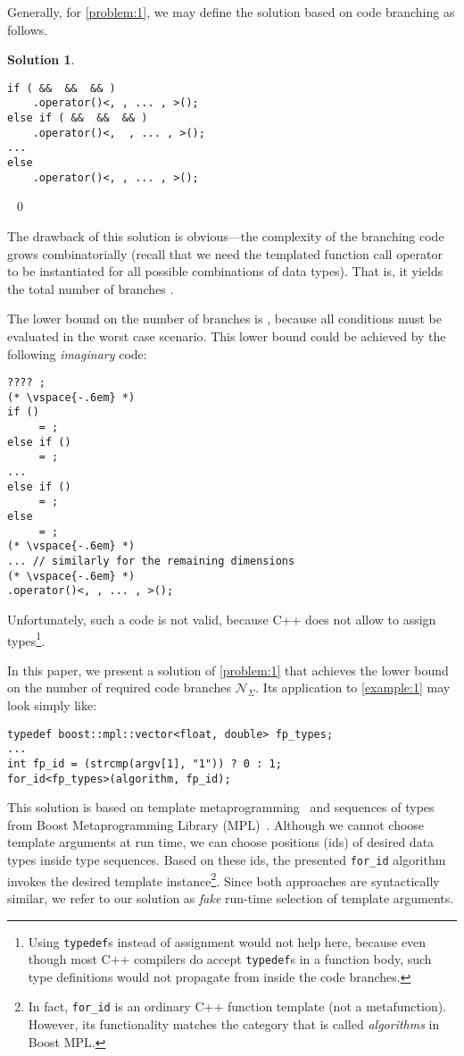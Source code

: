 \documentclass[10pt,a4paper]{article}
\theoremstyle{definition}\newtheorem{problem}{Problem}
\newtheorem{solution}{Solution}
\providecommand{\symcbsum}{\ensuremath{\mathcal{N}_{\Sigma}}\xspace}
\providecommand{\forid}{\texttt{for\_id}\xspace}
\begin{document}
Generally, for \autoref{problem:1}, we may define the solution based on code branching as follows.
\begin{solution}\ 
\begin{lstlisting}
if ( &&  &&  && )
    .operator()<, , ... , >();
else if ( &&  &&  && )
    .operator()<,  , ... , >();
...
else
    .operator()<, , ... , >();
\end{lstlisting}

\vspace{-.4em} \ \qed
\end{solution}

\vspace{-.6em}
The drawback of this solution is obvious---the complexity of the branching code grows combinatorially (recall that we need the templated function call operator to be instantiated for all possible combinations of data types). That is, it yields the total number of branches .

The lower bound on the number of branches is , because all conditions must be evaluated in the worst case scenario. This lower bound could be achieved by the following \emph{imaginary} code:
\begin{lstlisting}
???? ;
(* \vspace{-.6em} *)
if ()
     = ;
else if ()
     = ;
...
else if ()
     = ;
else
     = ;
(* \vspace{-.6em} *)
... // similarly for the remaining dimensions
(* \vspace{-.6em} *)
.operator()<, , ... , >();
\end{lstlisting}
Unfortunately, such a code is not valid, because C++ does not allow to assign types\footnote{Using \texttt{typedef}s instead of assignment would not help here, because even though most C++ compilers do accept \texttt{typedef}s in a function body, such type definitions would not propagate from inside the code branches.}.

In this paper, we present a solution of \autoref{problem:1} that achieves the lower bound on the number of required code branches \symcbsum. Its application to \autoref{example:1} may look simply like:
\begin{lstlisting}
typedef boost::mpl::vector<float, double> fp_types;
...
int fp_id = (strcmp(argv[1], "1")) ? 0 : 1;
for_id<fp_types>(algorithm, fp_id);
\end{lstlisting}
This solution is based on template metaprogramming~\cite{RefWorks:51,RefWorks:84,RefWorks:82,RefWorks:83} and sequences of types from Boost Metaprogramming Library (MPL)~\cite{RefWorks:53}. Although we cannot choose template arguments at run time, we can choose positions (ids) of desired data types inside type sequences. Based on these ids, the presented \forid algorithm invokes the desired template instance\footnote{In fact, \texttt{for\_id} is an ordinary C++ function template (not a metafunction). However, its functionality matches the category that is called \emph{algorithms} in Boost MPL.}. Since both approaches are syntactically similar, we refer to our solution as \emph{fake} run-time selection of template arguments.
\end{document}
